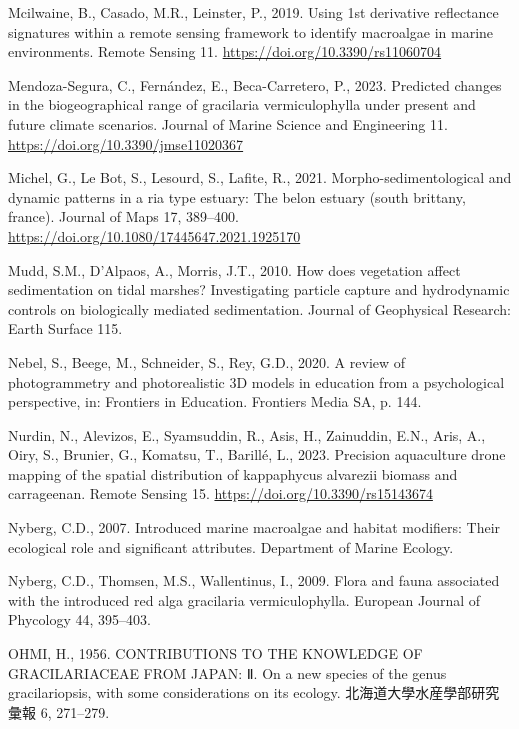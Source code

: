 \documentclass[
  letterpaper,
  DIV=11,
  numbers=noendperiod]{scrartcl}
\newlength{\cslhangindent}
\newenvironment{CSLReferences}[2] %
 {\begin{list}{}{%
  \setlength{\itemindent}{0pt}
  \setlength{\leftmargin}{0pt}
  \setlength{\parsep}{0pt}
  \ifodd #1
   \setlength{\leftmargin}{\cslhangindent}
   \setlength{\itemindent}{-1\cslhangindent}
  \fi
  \setlength{\itemsep}{#2\baselineskip}}}
 {\end{list}}
\begin{document}
\begin{CSLReferences}{1}{0}
Mcilwaine, B., Casado, M.R., Leinster, P., 2019. Using 1st derivative
reflectance signatures within a remote sensing framework to identify
macroalgae in marine environments. Remote Sensing 11.
\url{https://doi.org/10.3390/rs11060704}

Mendoza-Segura, C., Fernández, E., Beca-Carretero, P., 2023. Predicted
changes in the biogeographical range of gracilaria vermiculophylla under
present and future climate scenarios. Journal of Marine Science and
Engineering 11. \url{https://doi.org/10.3390/jmse11020367}

Michel, G., Le Bot, S., Lesourd, S., Lafite, R., 2021.
Morpho-sedimentological and dynamic patterns in a ria type estuary: The
belon estuary (south brittany, france). Journal of Maps 17, 389--400.
\url{https://doi.org/10.1080/17445647.2021.1925170}

Mudd, S.M., D'Alpaos, A., Morris, J.T., 2010. How does vegetation affect
sedimentation on tidal marshes? Investigating particle capture and
hydrodynamic controls on biologically mediated sedimentation. Journal of
Geophysical Research: Earth Surface 115.

Nebel, S., Beege, M., Schneider, S., Rey, G.D., 2020. A review of
photogrammetry and photorealistic 3D models in education from a
psychological perspective, in: Frontiers in Education. Frontiers Media
SA, p. 144.

Nurdin, N., Alevizos, E., Syamsuddin, R., Asis, H., Zainuddin, E.N.,
Aris, A., Oiry, S., Brunier, G., Komatsu, T., Barillé, L., 2023.
Precision aquaculture drone mapping of the spatial distribution of
kappaphycus alvarezii biomass and carrageenan. Remote Sensing 15.
\url{https://doi.org/10.3390/rs15143674}

Nyberg, C.D., 2007. Introduced marine macroalgae and habitat modifiers:
Their ecological role and significant attributes. Department of Marine
Ecology.

Nyberg, C.D., Thomsen, M.S., Wallentinus, I., 2009. Flora and fauna
associated with the introduced red alga gracilaria vermiculophylla.
European Journal of Phycology 44, 395--403.

OHMI, H., 1956. CONTRIBUTIONS TO THE KNOWLEDGE OF GRACILARIACEAE FROM
JAPAN: Ⅱ. On a new species of the genus gracilariopsis, with some
considerations on its ecology. 北海道大學水産學部研究彙報 6, 271--279.


\end{CSLReferences}
\end{document}
